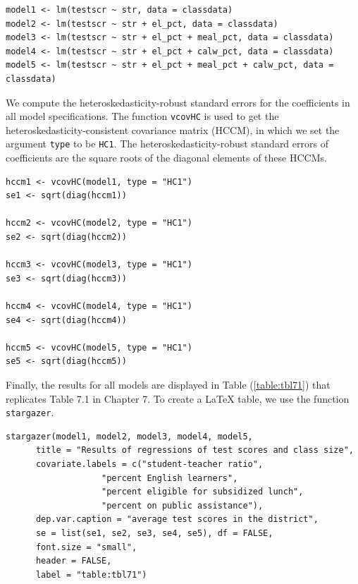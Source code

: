 \documentclass[11pt]{article}
\begin{document}
\begin{verbatim}
model1 <- lm(testscr ~ str, data = classdata)
model2 <- lm(testscr ~ str + el_pct, data = classdata)
model3 <- lm(testscr ~ str + el_pct + meal_pct, data = classdata)
model4 <- lm(testscr ~ str + el_pct + calw_pct, data = classdata)
model5 <- lm(testscr ~ str + el_pct + meal_pct + calw_pct, data = classdata)
\end{verbatim}

We compute the heteroskedasticity-robust standard errors for the
coefficients in all model specifications. The function \texttt{vcovHC} is
used to get the heteroskedasticity-consistent covariance matrix (HCCM), in
which we set the argument \texttt{type} to be \texttt{HC1}. The
heteroskedasticity-robust standard errors of coefficients are the
square roots of the diagonal elements of these HCCMs.

\begin{verbatim}
hccm1 <- vcovHC(model1, type = "HC1")
se1 <- sqrt(diag(hccm1))

hccm2 <- vcovHC(model2, type = "HC1")
se2 <- sqrt(diag(hccm2))

hccm3 <- vcovHC(model3, type = "HC1")
se3 <- sqrt(diag(hccm3))

hccm4 <- vcovHC(model4, type = "HC1")
se4 <- sqrt(diag(hccm4))

hccm5 <- vcovHC(model5, type = "HC1")
se5 <- sqrt(diag(hccm5))
\end{verbatim}

Finally, the results for all models are displayed in Table
(\ref{table:tbl71}) that replicates Table 7.1 in Chapter 7. To create
a \LaTeX{} table, we use the function \texttt{stargazer}.

\begin{verbatim}
stargazer(model1, model2, model3, model4, model5,
	  title = "Results of regressions of test scores and class size",
	  covariate.labels = c("student-teacher ratio",
			       "percent English learners",
			       "percent eligible for subsidized lunch",
			       "percent on public assistance"),
	  dep.var.caption = "average test scores in the district",
	  se = list(se1, se2, se3, se4, se5), df = FALSE,
	  font.size = "small",
	  header = FALSE,
	  label = "table:tbl71")
\end{verbatim}
\end{document}
